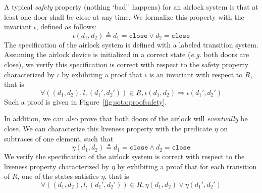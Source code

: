 \begin{example}
  A typical \emph{safety} property (nothing `bad'' happens) for an airlock
  system is that at least one door shall be close at any time.
  We formalize this property with the invariant \( \iota \), defined as follows:
  \[
    \iota( d_1, d_2) \triangleq d_1 = \mathtt{close} \vee d_2 = \mathtt{close}
  \]
  The specification of the airlock system is defined with a labeled transition
  system.
  Assuming the airlock device is initialized in a correct state (\emph{e.g.}
  both doors are close), we verify this specification is correct with respect to
  the safety property characterized by \( \iota \) by exhibiting a proof that
  \( \iota \) is an invariant with respect to \( R \), that is
  \[
    \forall ((d_1, d_2), l, (d_1', d_2')) \in R, \iota(d_1, d_2) \Rightarrow
    \iota(d_1', d_2')
  \]
  Such a proof is given in Figure~\ref{fig:sota:proofsafety}.

  In addition, we can also prove that both doors of the airlock will
  \emph{eventually} be close.
  We can characterize this liveness property with the predicate \( \eta \) on
  subtraces of one element, such that
  \[
    \eta(d_1, d_2) \triangleq d_1 = \mathtt{close} \wedge d_2 = \mathtt{close}
  \]
  We verify the specification of the airlock system is correct with respect to
  the liveness property characterized by \( \eta \) by exhibiting a proof that
  for each transition of \( R \), one of the states satisfies \( \eta \), that
  is
  \[
    \forall ((d_1, d_2), l, (d_1', d_2')) \in R, \eta(d_1, d_2) \vee \eta(d_1',
    d_2')
  \]

\end{example}

